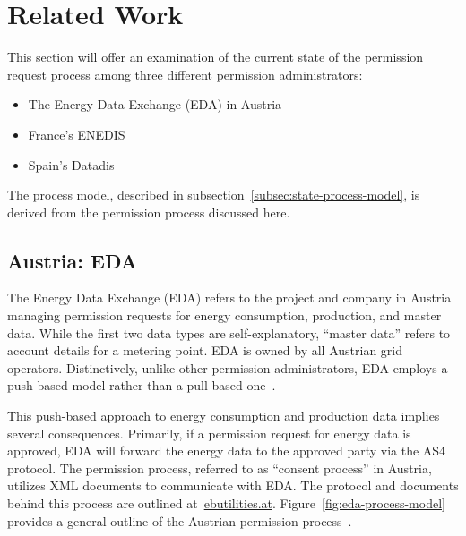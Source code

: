 \section{Related Work}\label{sec:related-work}
This section will offer an examination of the current state of the permission request process among three different permission administrators:
\begin{itemize}
    \item{}The Energy Data Exchange (EDA) in Austria
    \item{}France's ENEDIS
    \item{}Spain's Datadis
\end{itemize}

The process model, described in subsection\ \ref{subsec:state-process-model}, is derived from the permission process discussed here.

\subsection{Austria: EDA}\label{subsec:austria:-eda}
The Energy Data Exchange (EDA) refers to the project and company in Austria managing permission requests for energy consumption,
production, and master data.
While the first two data types are self-explanatory, ``master data'' refers to account details for a metering point.
EDA is owned by all Austrian grid operators.
Distinctively, unlike other permission administrators, EDA employs a push-based model rather than a pull-based one~\cite{eda}.

This push-based approach to energy consumption and production data implies several consequences.
Primarily, if a permission request for energy data is approved,
EDA will forward the energy data to the approved party via the AS4 protocol\cite{eda}.
The permission process, referred to as ``consent process'' in Austria, utilizes XML documents to communicate with EDA.
The protocol and documents behind this process are outlined at\ \href{https://www.ebutilities.at/}{ebutilities.at}.
Figure\ \ref{fig:eda-process-model} provides a general outline of the Austrian permission process~\cite{ebutilities}.

